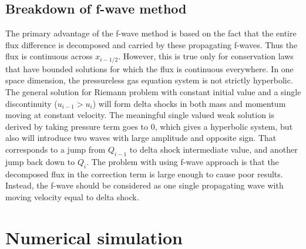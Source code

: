 \documentclass{article}
\begin{document}
\subsection{Breakdown of f-wave method}
The primary advantage of the f-wave method is based on the fact that the entire flux difference is decomposed and carried by these propagating f-waves. Thus the flux is continuous across $x_{i-1/2}$. However, this is true only for conservation laws that have bounded solutions for which the flux is continuous everywhere. In one space dimension, the pressureless gas equation system is not strictly hyperbolic. The general solution for Riemann problem with constant initial value and a single discontinuity ($u_{i-1}>u_{i}$) will form delta shocks in both mass and momentum moving at constant velocity. The meaningful single valued weak solution is derived by taking pressure term goes to $0$, which gives a hyperbolic system, but also will introduce two waves with large amplitude and opposite sign. That corresponds to a jump from $Q_{i-1}$ to delta shock intermediate value, and another jump back down to $Q_{i}$. The problem with using f-wave approach is that the decomposed flux in the correction term is large enough to cause poor results. Instead, the f-wave should be considered as one single propagating wave with moving velocity equal to delta shock.
	
\section{Numerical simulation}
\end{document}
